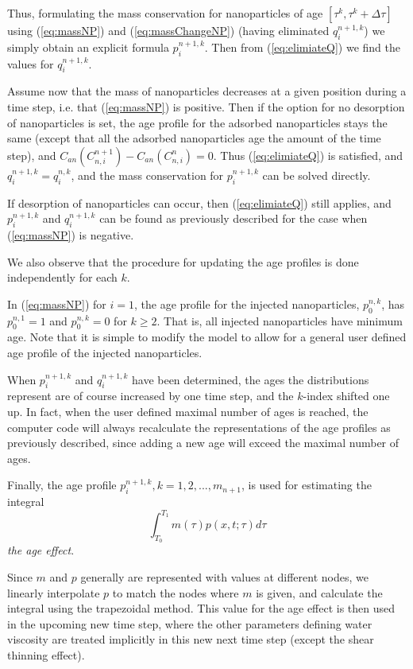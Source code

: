\documentclass[journal = enfuem, manuscript =  article]{achemso}
\begin{document}
Thus, formulating the mass conservation for nanoparticles of age $\left[\tau^k, \tau^k+\Delta\tau\right]$ using (\ref{eq:massNP}) and (\ref{eq:massChangeNP}) (having eliminated  $q_i^{n+1,k}$) we simply obtain an explicit formula $p_i^{n+1,k}$. Then from (\ref{eq:elimiateQ}) we find the values for $q_i^{n+1,k}$.

Assume now that the mass of nanoparticles decreases at a given position during a time step, i.e. that (\ref{eq:massNP}) is positive. Then if the option for no desorption of nanoparticles is set, the age profile for the adsorbed nanoparticles stays the same (except that all the adsorbed nanoparticles age the amount of the time step), and $C_{an}(C_{n,i}^{n+1})- C_{an}(C_{n,i}^{n})=0$. Thus (\ref{eq:elimiateQ}) is satisfied, and $q_i^{n+1,k}=q_i^{n,k}$, and the mass conservation for $p_i^{n+1,k}$ can be solved directly.

If desorption of nanoparticles can occur, then (\ref{eq:elimiateQ}) still applies, and $p_i^{n+1,k}$ and  $q_i^{n+1,k}$ can be found as previously described for the case when (\ref{eq:massNP}) is negative. 

We also observe that the procedure for updating the age profiles is done independently for each $k$.

In (\ref{eq:massNP}) for $i=1$, the age profile for the injected nanoparticles, $p_0^{n,k}$, has $p_0^{n,1}=1$ and $p_0^{n,k}=0$ for $k\geq2$. That is, all injected nanoparticles have minimum age. Note that it is simple to modify the model to allow for a general user defined age profile of the injected nanoparticles.

When $p_i^{n+1,k}$ and $q_i^{n+1,k}$ have been determined, the ages the distributions represent are of course increased by one time step, and the  $k$-index shifted one up. In fact, when the user defined maximal number of ages is reached, the computer code will always recalculate the representations of the age profiles as previously described, since adding a new age will exceed the maximal number of ages.

Finally, the age profile $p_i^{n+1,k},k=1,2,...,m_{n+1}$,  is used for estimating the integral
\begin{equation}
    \int_{T_0}^{T_1} m(\tau)p(x,t;\tau)d\tau
\end{equation}
\textit{the age effect}.

Since $m$ and $p$ generally are represented with values at different nodes, we linearly interpolate $p$ to match the nodes where $m$ is given, and calculate the integral using the trapezoidal method. This value for the age effect is then used in the upcoming new time step, where the other parameters defining water viscosity are treated implicitly in this new next time step (except the shear thinning effect).
\end{document}
